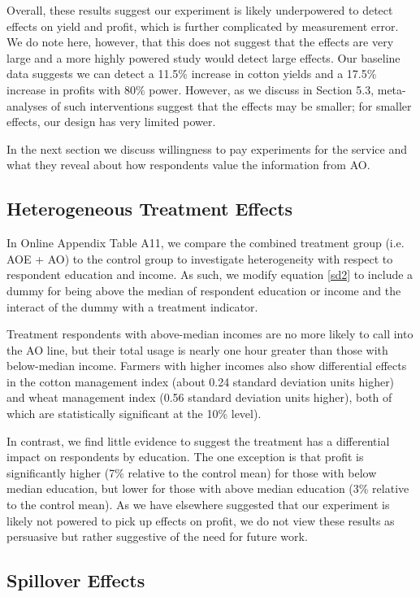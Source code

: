 \documentclass[12pt]{article}
\begin{document}
{Overall, these results suggest our experiment is likely underpowered to detect effects on yield and profit, which is further complicated by measurement error. We do note here, however, that this does not suggest that the effects are very large and a more highly powered study would detect large effects. Our baseline data suggests we can detect a 11.5\% increase in cotton yields and a 17.5\% increase in profits with 80\% power. However, as we discuss in Section 5.3, meta-analyses of such interventions suggest that the effects may be smaller; for smaller effects, our design has very limited power.

In the next section we discuss willingness to pay experiments for the service and what they reveal about how respondents value the information from AO. 

\subsection{\protect\normalsize Heterogeneous Treatment Effects}

{\normalsize In Online Appendix Table A11, we compare the combined treatment
group (i.e. AOE + AO) to the control group to investigate heterogeneity with respect to respondent education and income. As such, we modify equation \eqref{sd2} to include a dummy for being above the median of respondent education or income and the interact of the dummy with a treatment indicator. }

{\normalsize Treatment respondents with above-median incomes are no more
likely to call into the AO line, but their total usage is nearly one hour
greater than those with below-median income. Farmers with higher
incomes also show differential effects in the cotton management index (about
0.24 standard deviation units higher) and wheat management index (0.56 standard deviation units higher), both of which are statistically significant at the 10\% level).}

In contrast, we find little evidence to suggest the treatment has a differential impact on respondents by education. The one exception is that profit is significantly higher (7\% relative to the control mean) for those with below median education, but lower for those with above median education (3\% relative to the control mean). As we have elsewhere suggested that our experiment is likely not powered to pick up effects on profit, we do not view these results as persuasive but rather suggestive of the need for future work. 

\subsection{\protect\normalsize Spillover Effects}

}
\end{document}
